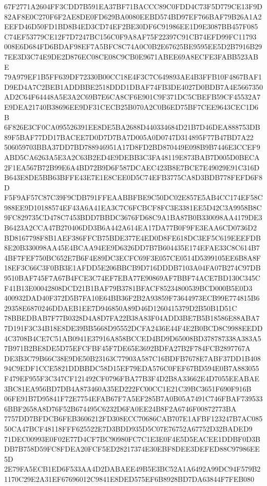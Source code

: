 \documentclass[UTF8,fontset=fandol,zihao=-4,a4paper]{ctexart}
\begin{document}
{{67F2771A2604FF3CDD7B591EA37BF71BACCC89C0FDD4C73F5D779CE13F9D82AF8E0C270F6F2AE8DE0FD629BA0080EEBD574BD97EF766BAF79B26A1A2
EEFD46D50FD1BD8B4ED3CD74EF2BE30DF6C91986EE1D9E3087BB457F085C74EF53779CE12F7D7247BC156C0F9A8AF75F22397C91CB74EFD99FC11793
008E6D684FD6BDAF98EF7A5BFC8C74A0C0B2E67625BE9595EE5D2B7916B297EE3D3C74E9DE2D876EC08CE08C9CB0E9671ABEE69A8ECFE3FABB523ABE
79A979EF1B5FF639DF72330B00CC18E4F3C7C649893AE4B3FFB10F4867BAF1D9ED4A7C2BEB1ADDBBE2518DDD1DBAF74FB3DE4027D0BDB7A4E5667350
AD2C64F64448A5E3A2C69B7E6CA8CF6E901C9F371DC5CBEFB59CF45532A7E9DEA21740B38696EE9DF31CECB25B070A2C0B6ED75BF7CEE9643CEC1D6B
6F826E3CF0CA095526391EE8DE5BA2688D440334684D21B7D46DEA888753DB89F5BAF77DD17BACEE7D0D7D7BA7D005A0D0747D314895F77B47BD7A22
506059703BBA37DD7BD788946951A17D8FD2BD870449E098B9B7446E3CCEF9ABD5CA6263A5E3A2C63B2ED4E9DEBB3C3FA48119E873BAB7D005D0BECA
2F1EA567B72B99E6A4BD72B9D6F587DCAEC423B8E7BCE7E49029E91C316DB643E8DE5BB63BFFE43E7E1E8CEE0D5C74EFB3775CA8D3BDB778FEFD6F8D
F5F9AF57C87C39F9CDB791FFEAABBFBE9C50DC02E857E5AB4CC174EF58C988EE9D10188574EF43A6A41EA3C7C6FCBCF8FC3E3381EE5D42C3A9958B8C
9FC829735CD478C7453BDD7BBDC3676FD68C9A1BA87B0B330098AA4179DE3B6423A2CCA47B270406DD3B6A442A614EA17DA77B0F9FE3EAA6CD0736D2
BD8167798F8B1AEF386FFCB75BDE377E4ED0D8FE618DC3EF5C619EEEFDB8E20B330098AA45E4BCAA94EE9D6326DD7B7B604435E174EFAE33C8C614B7
4BF7FEF750BC652E7B6F4E89DC3ECFC69F3E057CE0514D5399105EE6B8A8F18EF3C66C3F0BB3E1AFDD5E206BBCB9D716DDDB7103A04FA07B274C97DB
9510BAF745F7A67B4FCE3C74EF7EBA77E90869AF7BBF74ACE7BD130C345CF41B13E00042808DCD21B1BAF79B3781BFACF85234800539BCD000B5E0D3
400932DAD40F372D5B7FA10E64BB36F2B2A93859F73644973ECB99E774815B629358E6870246DDAEB1EE7D946850A89D46D1260415379D2B50B1D51C
78BBEDBAB7F77B0328D4A8D7FA22B38A83F04ADD3BE7B5B18586E88ABA77D191F3C34B18E8DE39BB5668D95552DCFA2436E44F4E2B0BCD8C9988EEDD
4C3708B4CE7C51AB0941E37916A858BCCED4BD9D65008BD378787338A383A57B971B2BE8DE5D75EFCFBF45F7DE65E3692BDFA27B2F784FCB2897767A
DE3B3C79B66C38E9DE50B23163C77903A587C16BDFB7678E7ABF37DD1B40894C9EDF1CCE5821DDBBDC58D15EF79EDA576C0FEF67BD594E0B7A883055
F479EF955F3C347CF121492CF0796FBA77B3F4D2B8A33662E4D7055EEABAE3BC81EA956BD7DB4A873460A35ED222FC00CC1E21C39BC3651F690F916B
06FE91B7D95841F72E7754EFAB67F7A5EF285B7A0B05A7491C746FBAF7395336BBF2658A8D76F52B674495C6232D6FA0EE24B8F2A6746F00872773BA
7757DD7BFDCB6FEB3606212FD308ECC70686CAB707E1AFBF123247B7AC08550CA47BCF48118FFF625522E7D3BDD935D5C07E76752A67752D32BADED9
71DEC00993E0F02E77D4CF7BC90980FC7C1E3E0F4E5D5EACEE1DDBF0D3BDB7B758D59FC8FDEA20FCF5ED28217374E30EBF8DEE3DEFED88C97986EE5D
2E79FA5ECB1ED6F533AA4D2DABAEE49B5E3BC52A1A6492A99DC94F579B21170C29E2A31EF67696012C9841E8DED575EF6B8928BD7DA63844F7FEB080
}}
\end{document}
